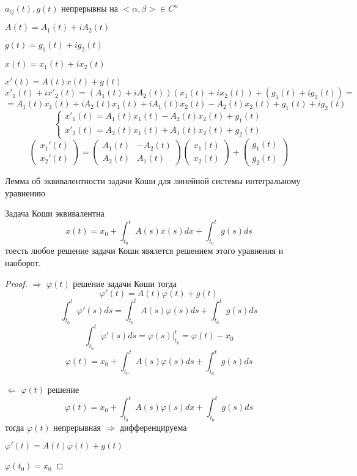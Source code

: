 \begin{block}
  $a_{ij}(t), g(t)$ непрерывны на $<\alpha, \beta> \in C^n$

  $A(t) = A_1(t) + iA_2(t)$

  $g(t) = g_1(t) + ig_2(t)$

  $x(t) = x_1(t) + ix_2(t)$

  $x'(t) = A(t)x(t) + g(t)$
  $$
  x'_1(t) + ix'_2(t) = (A_1(t) + iA_2(t)) (x_1(t) + ix_2(t)) +
  (g_1(t) + ig_2(t)) =
  $$
  $$
  = A_1(t)x_1(t) + iA_2(t)x_1(t) + iA_1(t)x_2(t) - A_2(t)x_2(t) +
  g_1(t) + ig_2(t)
  $$
  $$
  \left\{
  \begin{array}{l}
    x'_1(t) = A_1(t)x_1(t) - A_2(t)x_2(t) + g_1(t) \\
    x'_2(t) = A_2(t)x_1(t) + A_1(t)x_2(t) + g_2(t)
  \end{array}
  \right.
  $$
  $$
  \left(
  \begin{array}{c}
    x_1'(t) \\
    x_2'(t)
  \end{array}
  \right) =
  \left(
  \begin{array}{cc}
    A_1(t) & -A_2(t) \\
    A_2(t) & A_1(t)
  \end{array}
  \right)
  \left(
  \begin{array}{c}
    x_1(t) \\
    x_2(t)
  \end{array}
  \right) +
  \left(
  \begin{array}{c}
    g_1(t) \\
    g_2(t)
  \end{array}
  \right)
  $$
\end{block}

\begin{title}[\Large]
  Лемма об эквивалентности задачи Коши для линейной системы интегральному
  уравнению
\end{title}

\begin{block}
  Задача Коши эквивалентна
  $$
  x(t) = x_0 + \int_{t_0}^t A(s)x(s)dx +
  \int_{t_0}^t g(s)ds
  $$
  тоесть любое решение задачи Коши явялется решением этого уравнения и наоборот.
\end{block}

\begin{proof}
  $\Rightarrow$ $\varphi(t)$ решение задачи Коши тогда
  $$
  \varphi'(t) = A(t)\varphi(t) + g(t)
  $$
  $$
  \int_{t_0}^t \varphi'(s)ds = \int_{t_0}^t A(s) \varphi(s)ds +
  \int_{t_0}^t g(s) ds
  $$
  $$
  \int_{t_0}^t \varphi'(s)ds = \varphi(s)|_{t_0}^t = \varphi(t) - x_0
  $$
  $$
  \varphi(t) = x_0 + \int_{t_0}^t A(s) \varphi(s) ds  + \int_{t_0}^t g(s)ds
  $$

  $\Leftarrow$ $\varphi(t)$ решение
  $$
  \varphi(t) = x_0 + \int_{t_0}^t A(s)\varphi(s)dx +
  \int_{t_0}^t g(s)ds
  $$
  тогда $\varphi(t)$ непрерывная $\Rightarrow$ дифференцируема

  $\varphi'(t) = A(t)\varphi(t) + g(t)$

  $\varphi(t_0) = x_0$
\end{proof}

